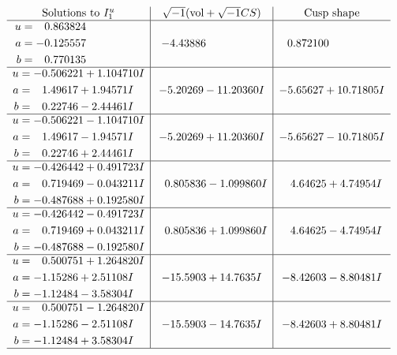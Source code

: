 \documentclass[1p]{elsarticle_modified}
\theoremstyle{definition}
\newcommand{\I}{\sqrt{-1}}
\begin{document}
$$\begin{array}{c|c|c}  
\text{Solutions to }I^u_{1}& \I (\text{vol} + \sqrt{-1}CS) & \text{Cusp shape}\\
 \hline 
\begin{aligned}
u &= \phantom{-}0.863824\phantom{ +0.000000I} \\
a &= -0.125557\phantom{ +0.000000I} \\
b &= \phantom{-}0.770135\phantom{ +0.000000I}\end{aligned}
 & -4.43886\phantom{ +0.000000I} & \phantom{-}0.872100\phantom{ +0.000000I} \\ \hline\begin{aligned}
u &= -0.506221 + 1.104710 I \\
a &= \phantom{-}1.49617 + 1.94571 I \\
b &= \phantom{-}0.22746 - 2.44461 I\end{aligned}
 & -5.20269 - 11.20360 I & -5.65627 + 10.71805 I \\ \hline\begin{aligned}
u &= -0.506221 - 1.104710 I \\
a &= \phantom{-}1.49617 - 1.94571 I \\
b &= \phantom{-}0.22746 + 2.44461 I\end{aligned}
 & -5.20269 + 11.20360 I & -5.65627 - 10.71805 I \\ \hline\begin{aligned}
u &= -0.426442 + 0.491723 I \\
a &= \phantom{-}0.719469 - 0.043211 I \\
b &= -0.487688 + 0.192580 I\end{aligned}
 & \phantom{-}0.805836 - 1.099860 I & \phantom{-}4.64625 + 4.74954 I \\ \hline\begin{aligned}
u &= -0.426442 - 0.491723 I \\
a &= \phantom{-}0.719469 + 0.043211 I \\
b &= -0.487688 - 0.192580 I\end{aligned}
 & \phantom{-}0.805836 + 1.099860 I & \phantom{-}4.64625 - 4.74954 I \\ \hline\begin{aligned}
u &= \phantom{-}0.500751 + 1.264820 I \\
a &= -1.15286 + 2.51108 I \\
b &= -1.12484 - 3.58304 I\end{aligned}
 & -15.5903 + 14.7635 I & -8.42603 - 8.80481 I \\ \hline\begin{aligned}
u &= \phantom{-}0.500751 - 1.264820 I \\
a &= -1.15286 - 2.51108 I \\
b &= -1.12484 + 3.58304 I\end{aligned}
 & -15.5903 - 14.7635 I & -8.42603 + 8.80481 I\\
 \hline 
 \end{array}$$\newpage\newpage\renewcommand{\arraystretch}{1}
\end{document}
